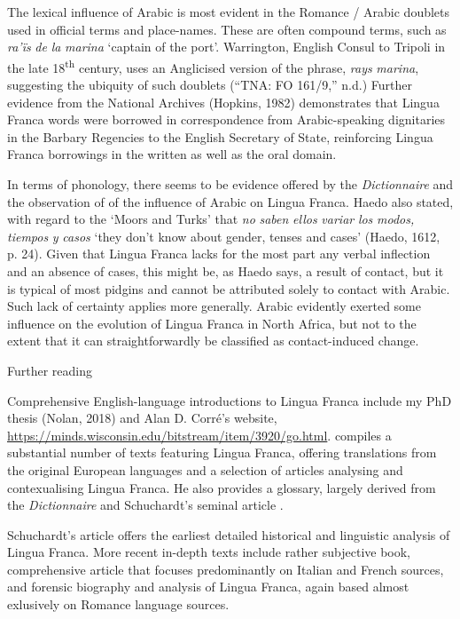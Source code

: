\documentclass[output=paper]{langsci/langscibook}
\begin{document}
The lexical influence of Arabic is most evident in the Romance / Arabic doublets used in official terms and place-names. These are often compound terms, such as \textit{ra’ïs} \textit{de} \textit{la} \textit{marina} ‘captain of the port’. Warrington, English Consul to Tripoli in the late 18\textsuperscript{th} century, uses an Anglicised version of the phrase, \textit{rays} \textit{marina}, suggesting the ubiquity of such doublets (“TNA: FO 161/9,” n.d.) Further evidence from the National Archives (Hopkins, 1982) demonstrates that Lingua Franca words were borrowed in correspondence from Arabic-speaking dignitaries in the Barbary Regencies to the English Secretary of State, reinforcing Lingua Franca borrowings in the written as well as the oral domain. 

In terms of phonology, there seems to be evidence offered by the \textit{Dictionnaire} and the observation of \citet{Haedo1612} of the influence of Arabic on Lingua Franca. Haedo also stated, with regard to the ‘Moors and Turks’ that \textit{no} \textit{saben} \textit{ellos} \textit{variar} \textit{los} \textit{modos,} \textit{tiempos} \textit{y} \textit{casos} ‘they don’t know about gender, tenses and cases’ (Haedo, 1612, p. 24). Given that Lingua Franca lacks for the most part any verbal inflection and an absence of cases, this might be, as Haedo says, a result of contact, but it is typical of most pidgins and cannot be attributed solely to contact with Arabic. Such lack of certainty applies more generally. Arabic evidently exerted some influence on the evolution of Lingua Franca in North Africa, but not to the extent that it can straightforwardly be classified as contact-induced change.

\begin{stylelsUnNumberedSection}
	Further reading
\end{stylelsUnNumberedSection}

Comprehensive English-language introductions to Lingua Franca include my PhD thesis (Nolan, 2018) and Alan D. Corré’s website, \url{https://minds.wisconsin.edu/bitstream/item/3920/go.html}. \citet{Corré2005} compiles a substantial number of texts featuring Lingua Franca, offering translations from the original European languages and a selection of articles analysing and contexualising Lingua Franca. He also provides a glossary, largely derived from the \textit{Dictionnaire}  and Schuchardt’s seminal article . 

Schuchardt’s article  offers the earliest detailed historical and linguistic analysis of Lingua Franca. More recent in-depth texts include  rather subjective book,  comprehensive article that focuses predominantly on Italian and French sources, and  forensic biography and analysis of Lingua Franca, again based almost exlusively on Romance language sources. 
\end{document}
